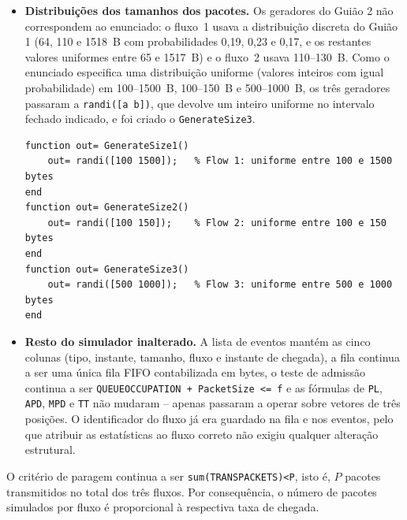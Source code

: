 \documentclass[11pt,a4paper]{article}
\begin{document}
\begin{itemize}
    \begin{lstlisting}[basicstyle=\ttfamily\scriptsize]
            % agora temos um caso para cada fluxo
            switch Flow
                case 1
                    nextPacketSize= GenerateSize1();
                case 2
                    nextPacketSize= GenerateSize2();
                case 3
                    nextPacketSize= GenerateSize3();
            end
    \end{lstlisting}

    \item \textbf{Distribuições dos tamanhos dos pacotes.} Os geradores do
    Guião 2 não correspondem ao enunciado: o fluxo~1 usava a distribuição
    discreta do Guião 1 (64, 110 e 1518~B com probabilidades 0,19, 0,23 e
    0,17, e os restantes valores uniformes entre 65 e 1517~B) e o fluxo~2
    usava 110--130~B. Como o enunciado especifica uma distribuição uniforme
    (valores inteiros com igual probabilidade) em 100--1500~B, 100--150~B e
    500--1000~B, os três geradores passaram a \lstinline|randi([a b])|, que
    devolve um inteiro uniforme no intervalo fechado indicado, e foi criado o
    \lstinline|GenerateSize3|.

    \begin{lstlisting}[basicstyle=\ttfamily\scriptsize]
function out= GenerateSize1()
    out= randi([100 1500]);   % Flow 1: uniforme entre 100 e 1500 bytes
end
function out= GenerateSize2()
    out= randi([100 150]);    % Flow 2: uniforme entre 100 e 150 bytes
end
function out= GenerateSize3()
    out= randi([500 1000]);   % Flow 3: uniforme entre 500 e 1000 bytes
end
    \end{lstlisting}

    \item \textbf{Resto do simulador inalterado.} A lista de eventos mantém as
    cinco colunas (tipo, instante, tamanho, fluxo e instante de chegada), a
    fila continua a ser uma única fila FIFO contabilizada em bytes, o teste de
    admissão continua a ser
    \lstinline|QUEUEOCCUPATION + PacketSize <= f| e as fórmulas de
    \texttt{PL}, \texttt{APD}, \texttt{MPD} e \texttt{TT} não mudaram -- apenas
    passaram a operar sobre vetores de três posições. O identificador do fluxo
    já era guardado na fila e nos eventos, pelo que atribuir as estatísticas ao
    fluxo correto não exigiu qualquer alteração estrutural.
\end{itemize}

O critério de paragem continua a ser \lstinline|sum(TRANSPACKETS)<P|, isto é,
$P$ pacotes transmitidos no total dos três fluxos. Por consequência, o número
de pacotes simulados por fluxo é proporcional à respectiva taxa de chegada.
\end{document}
